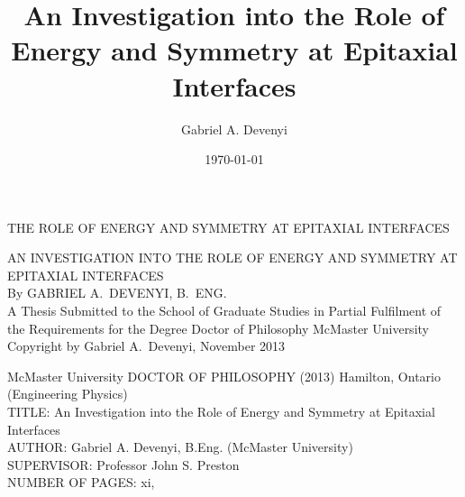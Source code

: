 \documentclass[letterpaper,12pt,twoside,openright]{report}
\title{An Investigation into the Role of Energy and Symmetry at Epitaxial Interfaces}
\author{Gabriel A. Devenyi}
\date{\today}
\begin{document}
\begin{titlepage} %
    \thispagestyle{empty}
    \vspace*{\fill}
    \begin{center}{\Large
    \uppercase{The Role of Energy and Symmetry at Epitaxial Interfaces}}
    \end{center}
    \vspace*{\fill}
    \setcounter{page}{0}
\end{titlepage}
\begin{titlepage} %
\thispagestyle{empty}
\centering
\vspace*{\fill} %
{\Large \uppercase{An Investigation into the Role of Energy and Symmetry at Epitaxial Interfaces}\\
\vfill
By GABRIEL A.\ DEVENYI, B.\ ENG.\\}
\vfill
A Thesis Submitted to the School of Graduate Studies in Partial Fulfilment of
the Requirements for the Degree Doctor of Philosophy
\vfill%
McMaster University \textcopyright{} Copyright by Gabriel A.\ Devenyi, November 2013
\end{titlepage}
{\noindent McMaster University DOCTOR OF PHILOSOPHY (2013) Hamilton, Ontario (Engineering Physics)\\
TITLE: An Investigation into the Role of Energy and Symmetry at Epitaxial Interfaces\\
AUTHOR: Gabriel A. Devenyi, B.Eng. (McMaster University)\\
SUPERVISOR: Professor John S. Preston\\
NUMBER OF PAGES: xi,~\pageref{LastPage}}
\end{document}
